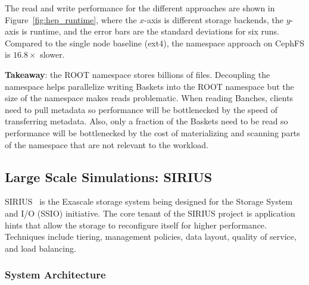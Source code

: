 
The read and write performance for the different approaches are shown in
Figure~\ref{fig:hep_runtime}, where the \(x\)-axis is different storage
backends, the \(y\)-axis is runtime, and the error bars are the standard
deviations for six runs. Compared to the single node baseline (ext4), the
namespace approach on CephFS is \(16.8\times\) slower. 

\textbf{Takeaway}: the ROOT namespace stores billions of files. Decoupling the
namespace helps parallelize writing Baskets into the ROOT namespace but the
size of the namespace makes reads problematic. When reading Banches, clients
need to pull metadata so performance will be bottlenecked by the speed of
transferring metadata. Also, only a fraction of the Baskets need to be read so
performance will be bottlenecked by the cost of materializing and scanning
parts of the namespace that are not relevant to the workload.

\subsection{Large Scale Simulations: SIRIUS}

SIRIUS~\cite{klasky:journal16-sirius} is the Exascale storage system being
designed for the Storage System and I/O (SSIO) initiative. The core tenant of
the SIRIUS project is application hints that allow the storage to reconfigure
itself for higher performance. Techniques include tiering, management policies,
data layout, quality of service, and load balancing. 

\subsubsection{System Architecture}

